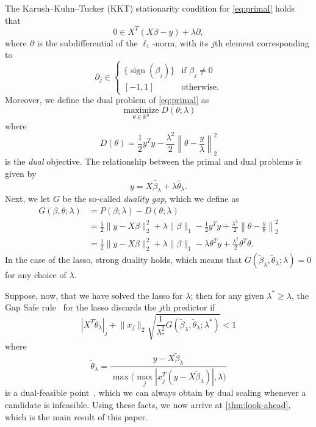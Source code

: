 \documentclass[b5paper,10pt,abstractoff,DIV=calc,headings=normal,twoside]{scrartcl}
\theoremstyle{plain}
\theoremstyle{definition}
\theoremstyle{remark}
\DeclareMathOperator{\sign}{sign}
\begin{document}
The Karush--Kuhn--Tucker (KKT) stationarity condition for \eqref{eq:primal}
holds that
\begin{equation}
  \label{eq:stationarity}
  0 \in X^T(X\beta - y) + \lambda\partial,
\end{equation}
where \(\partial\) is the subdifferential of the \(\ell_1\)-norm, with
its \(j\)th element corresponding to
\begin{equation}
  \label{eq:subdifferential}
  \partial_j \in
  \begin{cases}
    \{\sign(\beta_j)\} & \text{if } \beta_j \neq 0 \\
    [-1,1]             & \text{otherwise.}
  \end{cases}
\end{equation}
Moreover, we define the dual problem of \eqref{eq:primal} as
\begin{equation}
  \label{eq:dual}
  \operatorname*{maximize}_{\theta \in \mathbb{R}^n} D(\theta; \lambda)
\end{equation}
where
\begin{equation}
  D(\theta) = \frac 12 y^T y - \frac{\lambda^2}{2} \left\lVert \theta
  - \frac y \lambda \right\rVert_2^2
\end{equation}
is the \emph{dual} objective.
The relationship between the primal and dual problems is given by
\[
  y = X\hat\beta_\lambda + \lambda \hat\theta_\lambda.
\]
Next, we let \(G\) be the so-called \emph{duality gap}, which we define
as
\begin{equation}
  \begin{aligned}
    G(\beta, \theta; \lambda)
     & = P(\beta; \lambda) - D(\theta; \lambda)                                                 \\
     & = \frac 12 \lVert y - X\beta\rVert_2^2 + \lambda \lVert \beta \rVert_1
    - \frac 12 y^T y + \frac{\lambda^2}{2} \left\lVert \theta - \frac y \theta \right\rVert_2^2 \\
     & =
    \frac 12 \lVert y - X\beta\rVert_2^2 + \lambda \lVert \beta \rVert_1
    - \lambda \theta^T y + \frac{\lambda^2}{2} \theta^T \theta.
  \end{aligned}
\end{equation}
In the case of the lasso, strong duality holds, which means that
\(G(\tilde\beta_\lambda, \tilde\theta_\lambda; \lambda) = 0\) for any
choice of \(\lambda\).

Suppose, now, that we have solved the lasso for \(\lambda\); then
for any given \(\lambda^* \geq \lambda\),
the Gap Safe rule~\citep{ndiaye2017} for the lasso discards the \(j\)th
predictor if
\begin{equation}
  \label{eq:gap-safe-rule}
  |X^T \tilde \theta_\lambda|_j + \lVert x_j\rVert_2
  \sqrt{\frac{1}{\lambda_*^2}
    G(\tilde \beta_\lambda, \tilde \theta_\lambda; \lambda^*)}
  < 1
\end{equation}
where
\[
  \tilde\theta_\lambda = \frac{y - X\tilde\beta_\lambda}{
    \max\big( \max_j|x_j^T(y - X\tilde\beta_\lambda)|, \lambda\big)}
\]
is a dual-feasible point~\cite{ndiaye2017}, which we can always obtain
by dual scaling whenever a candidate is infeasible. Using these facts,
we now arrive at \autoref{thm:look-ahead}, which is the main result of
this paper.
\end{document}
